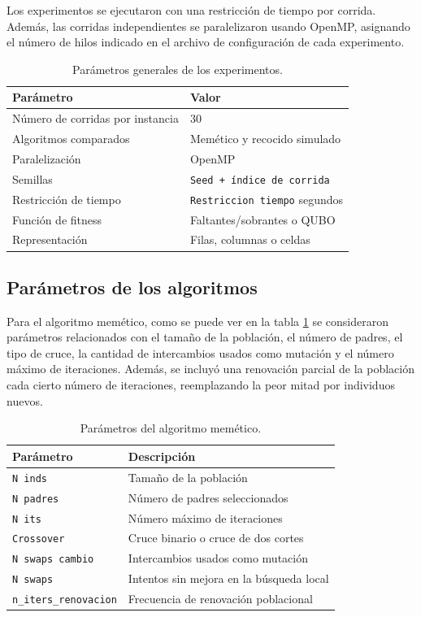 \documentclass{article}
\begin{document}
Los experimentos se ejecutaron con una restricción de tiempo por corrida. Además, las corridas independientes se paralelizaron usando OpenMP, asignando el número de hilos indicado en el archivo de configuración de cada experimento.

\begin{table}[H]
\centering
\caption{Parámetros generales de los experimentos.}
\begin{tabular}{ll}
\hline
Parámetro & Valor \\
\hline
Número de corridas por instancia & 30 \\
Algoritmos comparados & Memético y recocido simulado \\
Paralelización & OpenMP \\
Semillas & \texttt{Seed + índice de corrida} \\
Restricción de tiempo & \texttt{Restriccion tiempo} segundos \\
Función de fitness & Faltantes/sobrantes o QUBO \\
Representación & Filas, columnas o celdas \\
\hline
\end{tabular}
\end{table}

\subsection{Parámetros de los algoritmos}

Para el algoritmo memético, como se puede ver en la tabla \ref{tab:params} se consideraron parámetros relacionados con el tamaño de la población, el número de padres, el tipo de cruce, la cantidad de intercambios usados como mutación y el número máximo de iteraciones. Además, se incluyó una renovación parcial de la población cada cierto número de iteraciones, reemplazando la peor mitad por individuos nuevos.
\begin{table}[H]
\centering
\caption{Parámetros del algoritmo memético.}
\label{tab:params}
\begin{tabular}{ll}
\hline
Parámetro & Descripción \\
\hline
\texttt{N inds} & Tamaño de la población \\
\texttt{N padres} & Número de padres seleccionados \\
\texttt{N its} & Número máximo de iteraciones \\
\texttt{Crossover} & Cruce binario o cruce de dos cortes \\
\texttt{N swaps cambio} & Intercambios usados como mutación \\
\texttt{N swaps} & Intentos sin mejora en la búsqueda local \\
\texttt{n\_iters\_renovacion} & Frecuencia de renovación poblacional \\
\hline
\end{tabular}
\end{table}
\end{document}
